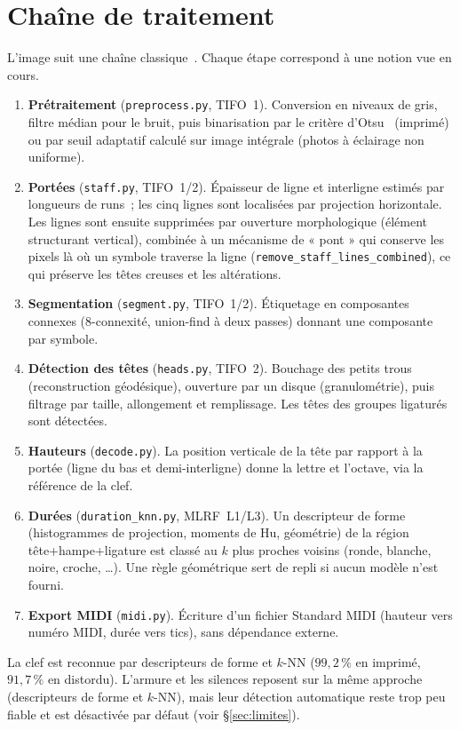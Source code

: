 \documentclass[11pt,a4paper]{article}
\begin{document}
\section{Chaîne de traitement}
L'image suit une chaîne classique~\cite{rebelo2012}. Chaque étape correspond à une notion vue en cours.
\begin{enumerate}
\item \textbf{Prétraitement} (\texttt{preprocess.py}, TIFO~1). Conversion en niveaux de gris, filtre médian pour
le bruit, puis binarisation par le critère d'Otsu~\cite{otsu1979} (imprimé) ou par seuil adaptatif calculé sur
image intégrale (photos à éclairage non uniforme).
\item \textbf{Portées} (\texttt{staff.py}, TIFO~1/2). Épaisseur de ligne et interligne estimés par longueurs de
runs~; les cinq lignes sont localisées par projection horizontale. Les lignes sont ensuite supprimées par
ouverture morphologique (élément structurant vertical), combinée à un mécanisme de « pont » qui conserve les
pixels là où un symbole traverse la ligne (\texttt{remove\_staff\_lines\_combined}), ce qui préserve les têtes
creuses et les altérations.
\item \textbf{Segmentation} (\texttt{segment.py}, TIFO~1/2). Étiquetage en composantes connexes (8-connexité,
union-find à deux passes) donnant une composante par symbole.
\item \textbf{Détection des têtes} (\texttt{heads.py}, TIFO~2). Bouchage des petits trous (reconstruction
géodésique), ouverture par un disque (granulométrie), puis filtrage par taille, allongement et remplissage.
Les têtes des groupes ligaturés sont détectées.
\item \textbf{Hauteurs} (\texttt{decode.py}). La position verticale de la tête par rapport à la portée (ligne du
bas et demi-interligne) donne la lettre et l'octave, via la référence de la clef.
\item \textbf{Durées} (\texttt{duration\_knn.py}, MLRF~L1/L3). Un descripteur de forme (histogrammes de
projection, moments de Hu, géométrie) de la région tête+hampe+ligature est classé au $k$ plus proches voisins
(ronde, blanche, noire, croche, \dots). Une règle géométrique sert de repli si aucun modèle n'est fourni.
\item \textbf{Export MIDI} (\texttt{midi.py}). Écriture d'un fichier Standard MIDI (hauteur vers numéro MIDI,
durée vers tics), sans dépendance externe.
\end{enumerate}
La clef est reconnue par descripteurs de forme et $k$-NN ($99{,}2\,\%$ en imprimé, $91{,}7\,\%$ en distordu).
L'armure et les silences reposent sur la même approche (descripteurs de forme et $k$-NN), mais leur détection
automatique reste trop peu fiable et est désactivée par défaut (voir §\ref{sec:limites}).
\end{document}
